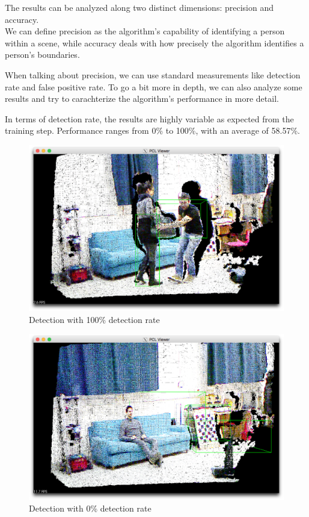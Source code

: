 \documentclass[a4paper,11pt,titlepage]{article}
\begin{document}
The results can be analyzed along two distinct dimensions: precision and
accuracy. \\
We can define precision as the algorithm's capability of identifying a person
within a scene, while accuracy deals with how precisely the algorithm identifies
a person's boundaries.

When talking about precision, we can use standard measurements like detection
rate and false positive rate. To go a bit more in depth, we can also analyze
some results and try to carachterize the algorithm's performance in more detail.

In terms of detection rate, the results are highly variable as expected from the
training step. Performance ranges from 0\% to 100\%, with an average of 58.57\%.

\begin{figure}[h]
  \centering
  \includegraphics[scale=0.2]{no_missing_but_inaccurate.png}
  \caption{Detection with 100\% detection rate}
  \label{fig:no_missing_but_inaccurate}
\end{figure}

\begin{figure}[h]
  \centering
  \includegraphics[scale=0.2]{zero_detection_rate.png}
  \caption{Detection with 0\% detection rate}
  \label{fig:zero_detection_rate}
\end{figure}
\end{document}
